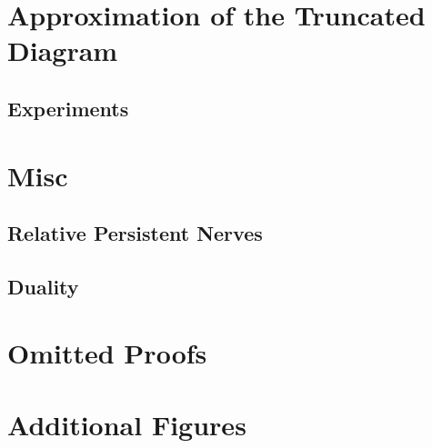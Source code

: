 \documentclass[12pt]{article}
\begin{document}
\clearpage
\section{Approximation of the Truncated Diagram}
  

  \subsection{Experiments}
    





\clearpage
\appendix
\section{Misc}\label{apx:misc}
\subsection{Relative Persistent Nerves}\label{apx:nerves}


\subsection{Duality}\label{apx:duality}


\section{Omitted Proofs}\label{apx:omit}
\printproofs

\section{Additional Figures}\label{apx:extra}

%
% 

\end{document}
